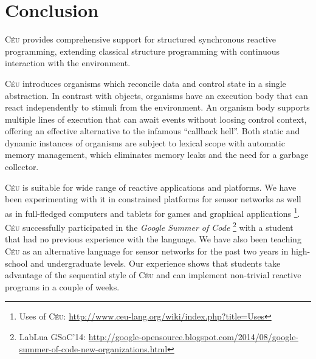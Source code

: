 \documentclass{acm_proc_article-sp}
\newcommand{\CEU}{\textsc{C\'{e}u}\xspace}
\newcommand{\1}{\;}
\newcommand{\2}{\;\;}
\newcommand{\3}{\;\;\;}
\newcommand{\5}{\;\;\;\;\;}
\newcommand{\URL}{\small\url}
\begin{document}
\section{Conclusion}
\label{sec.conclusion}

\CEU provides comprehensive support for structured synchronous reactive 
programming, extending classical structure programming with continuous 
interaction with the environment.

\CEU introduces organisms which reconcile data and control state in a single 
abstraction.
%
In contrast with objects, organisms have an execution body that can react 
independently to stimuli from the environment.
An organism body supports multiple lines of execution that can await events 
without loosing control context, offering an effective alternative to the 
infamous ``callback hell''.
%
Both static and dynamic instances of organisms are subject to lexical scope 
with automatic memory management, which eliminates memory leaks and the need 
for a garbage collector.

\CEU is suitable for wide range of reactive applications and platforms.
%
We have been experimenting with it in constrained platforms for sensor networks 
as well as in full-fledged computers and tablets for games and graphical 
applications%
\footnote{Uses of \CEU: \URL{http://www.ceu-lang.org/wiki/index.php?title=Uses}}.
%
\CEU successfully participated in the \emph{Google Summer of Code}%
\footnote{LabLua GSoC'14: 
\small{\URL{http://google-opensource.blogspot.com/2014/08/google-summer-of-code-new-organizations.html}}}
with a student that had no previous experience with the language.
%
We have also been teaching \CEU as an alternative language for sensor networks 
for the past two years in high-school and undergraduate levels.
%
Our experience shows that students take advantage of the sequential style of 
\CEU and can implement non-trivial reactive programs in a couple of weeks.
\end{document}
